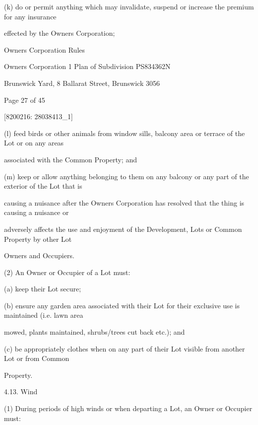 \documentclass{article}
\begin{document}
{\fontsize{9.962}{1}(k) do or permit anything which may invalidate, suspend or increase the premium for any insurance }

{\fontsize{10.02}{1}effected by the Owners Corporation; }

\newpage





{\fontsize{9}{1}Owners Corporation Rules }

{\fontsize{9}{1}Owners Corporation 1 Plan of Subdivision PS834362N }

{\fontsize{9}{1}Brunswick Yard, 8 Ballarat Street, Brunswick 3056 }


{\fontsize{9}{1}Page 27  of 45 }



{\fontsize{7.02}{1}[8200216: 28038413\_1] }

{\fontsize{9.962}{1}(l) feed birds or other animals from window sills, balcony area or terrace of the Lot or on any areas }

{\fontsize{10.02}{1}associated with the Common Property; and }

{\fontsize{9.962}{1}(m) keep or allow anything belonging to them on any balcony or any part of the exterior of the Lot that is }

{\fontsize{10.02}{1}causing a nuisance after the Owners Corporation has resolved that the thing is causing a nuisance or }

{\fontsize{10.02}{1}adversely affects the use and enjoyment of the Development, Lots or Common Property by other Lot }

{\fontsize{10.02}{1}Owners and Occupiers. }

{\fontsize{9.962}{1}(2) An Owner or Occupier of a Lot must: }

{\fontsize{9.962}{1}(a) keep their Lot secure; }

{\fontsize{9.962}{1}(b) ensure any garden area associated with their Lot for their exclusive use is maintained (i.e. lawn area }

{\fontsize{10.02}{1}mowed, plants maintained, shrubs/trees cut back etc.); and }

{\fontsize{9.962}{1}(c) be appropriately clothes when on any part of their Lot visible from another Lot or from Common }

{\fontsize{10.02}{1}Property. }

{\fontsize{9.99}{1}4.13. Wind }

{\fontsize{9.962}{1}(1) During periods of high winds or when departing a Lot, an Owner or Occupier must: }
\end{document}
